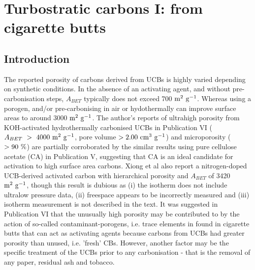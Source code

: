 \chapter{Turbostratic carbons I: from cigarette butts}
\label{ch:cbs}

\newpage

\section{Introduction}

The reported porosity of carbons derived from UCBs is highly varied depending on synthetic conditions. In the absence of an activating agent, and without pre-carbonisation steps, $A_{BET}$ typically does not exceed 700 $\rm m^2\ g^{-1}$.\citep{Koochaki2019, Soltani2013, Yazdi2012, Lee2014, Hamzah2017} Whereas using a porogen, and/or pre-carbonising in air or hydothermally can improve surface areas to around 3000 $\rm m^2\ g^{-1}$.\citep{xiong2018, Koochaki2019, Sun2017, Bilge2019} The author's reports of ultrahigh porosity from KOH-activated hydrothermally carbonised UCBs in Publication VI ($A_{BET}\ \rm >\ 4000\ m^2\ g^{-1} $, pore volume $\rm > 2.00\ cm^3\ g^{-1}$) and microporosity ($\rm > 90\ \%$) are partially corroborated by the similar results using pure cellulose acetate (CA) in Publication V, suggesting that CA is an ideal candidate for activation to high surface area carbons. Xiong et al also report a nitrogen-doped UCB-derived activated carbon with hierarchical porosity and $A_{BET}$ of 3420 $\rm m^2\ g^{-1}$, though this result is dubious as (i) the  isotherm does not include ultralow pressure data, (ii) freespace appears to be incorrectly measured and (iii) isotherm measurement is not described in the text.\citep{xiong2019nitrogen} It was suggested in Publication VI that the unusually high porosity may be contributed to by the action of so-called contaminant-porogens, i.e. trace elements in found in cigarette butts that can act as activating agents because carbons from UCBs had greater porosity than unused, i.e. 'fresh' CBs. However, another factor may be the specific treatment of the UCBs prior to any carbonisation - that is the removal of any paper, residual ash and tobacco.

